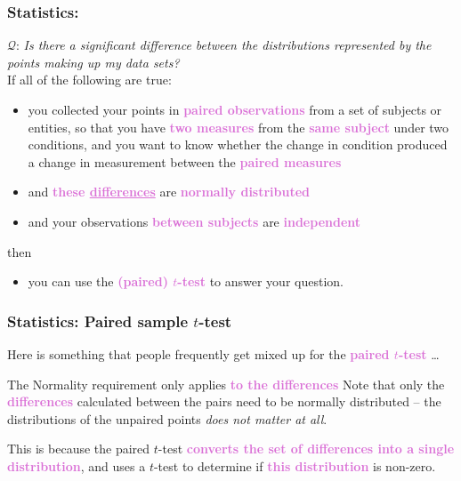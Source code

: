 \documentclass{beamer}
\newcommand{\key}[1]{\textcolor{orchid}{{\bf #1}}}
\newcommand{\kq}[1]{\textcolor{burntumber}{$\mathcal{Q}$: \emph{#1}}}
\begin{document}
\begin{frame}
\frametitle{Statistics: }
\kq{Is there a significant difference between the distributions represented by the points making up my data sets?}\\
\pause
\vspace{0.5em}
If all of the following are true:
\begin{itemize}
\item you collected your points in \key{paired observations}
from a set of subjects or entities, so that you have \key{two measures}
from the \key{same subject} under two conditions, and you want to know
whether the change in condition produced a change in measurement
between the \key{paired measures}
\item and \key{these \underline{differences}} are \key{normally distributed} \pause
\item and your observations \key{between subjects} are \key{independent}
\end{itemize}
then \pause
\begin{itemize}
\item you can use the \key{(paired) $t$-test}
to answer your question.
\end{itemize}
\end{frame}


\begin{frame}
\frametitle{Statistics: Paired sample $t$-test}\label{caveat:pairs}
Here is something that people frequently get mixed up for
the \key{paired $t$-test} \dots
\vspace{2em}

\begin{block}{The Normality requirement only applies \key{to the differences}}
\vspace{1em}
Note that only the \key{differences} calculated between the pairs
need to be normally distributed -- the distributions of the
unpaired points \emph{does not matter at all}.
\vspace{1em}

This is because the paired $t$-test \key{converts the set of differences
into a single distribution}, and uses a $t$-test to determine if \key{this
distribution} is non-zero.
\vspace{1em}
\end{block}
\end{frame}
\end{document}
